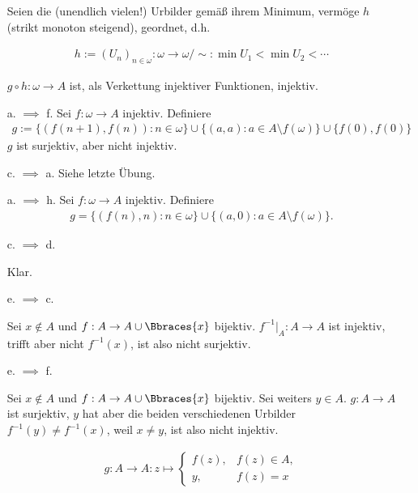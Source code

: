 \begin{solution}
\begin{itemize}
    \phantom{}

    Seien die (unendlich vielen!) Urbilder gemäß ihrem Minimum, vermöge $h$ (strikt monoton steigend), geordnet, d.h.

    \begin{align*}
      h := (U_n)_{n \in \omega}:
      \omega \to \omega / \sim:
      \min U_1 < \min U_2 < \cdots
    \end{align*}

    $g \circ h: \omega \to A$ ist, als Verkettung injektiver Funktionen, injektiv.
  \item[a. $\implies$ f.] Sei $f: \omega \to A$ injektiv. Definiere
  \begin{align*}
    g := \{(f(n+1),f(n)): n \in \omega\} \cup \{(a,a): a \in A \setminus f(\omega)\}
    \cup \{f(0),f(0)\}
  \end{align*}
  $g$ ist surjektiv, aber nicht injektiv.
  \item [c. $\implies$ a.] Siehe letzte Übung.
  \item [a. $\implies$ h.] Sei $f: \omega \to A$ injektiv. Definiere
  \begin{align*}
    g = \{(f(n), n): n \in \omega\} \cup \{(a,0): a \in A \setminus f(\omega)\}.
  \end{align*}

  \item[c. $\implies$ d.]

  Klar.

  \item[e. $\implies$ c.]

  Sei $x \not \in A$ und $f: A \to A \cup \Bbraces{x}$ bijektiv.
  $f^{-1} |_A: A \to A$ ist injektiv, trifft aber nicht $f^{-1}(x)$, ist also nicht surjektiv.

  \item[e. $\implies$ f.]

  Sei $x \not \in A$ und $f: A \to A \cup \Bbraces{x}$ bijektiv.
  Sei weiters $y \in A$.
  $g: A \to A$ ist surjektiv, $y$ hat aber die beiden verschiedenen Urbilder $f^{-1}(y) \neq f^{-1}(x)$, weil $x \neq y$, ist also nicht injektiv.

  \begin{align*}
    g:
    A \to A:
    z
    \mapsto
    \begin{cases}
      f(z), & f(z) \in A, \\
      y,    & f(z) = x
    \end{cases}
  \end{align*}

\end{itemize}

\end{solution}

